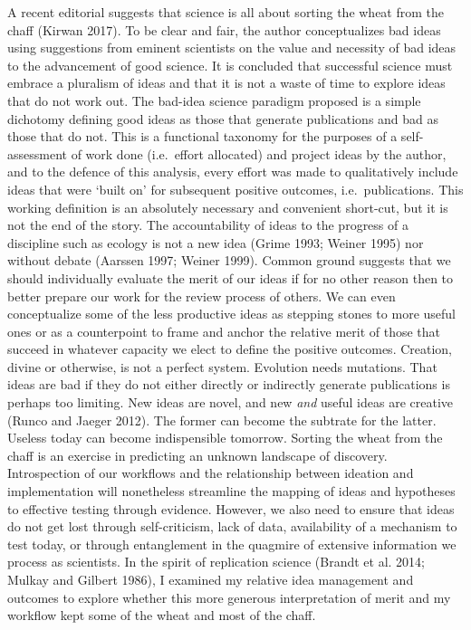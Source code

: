\documentclass[]{elsarticle} %
\begin{document}
A recent editorial suggests that science is all about sorting the wheat
from the chaff (Kirwan 2017). To be clear and fair, the author
conceptualizes bad ideas using suggestions from eminent scientists on
the value and necessity of bad ideas to the advancement of good science.
It is concluded that successful science must embrace a pluralism of
ideas and that it is not a waste of time to explore ideas that do not
work out. The bad-idea science paradigm proposed is a simple dichotomy
defining good ideas as those that generate publications and bad as those
that do not. This is a functional taxonomy for the purposes of a
self-assessment of work done (i.e.~effort allocated) and project ideas
by the author, and to the defence of this analysis, every effort was
made to qualitatively include ideas that were `built on' for subsequent
positive outcomes, i.e.~publications. This working definition is an
absolutely necessary and convenient short-cut, but it is not the end of
the story. The accountability of ideas to the progress of a discipline
such as ecology is not a new idea (Grime 1993; Weiner 1995) nor without
debate (Aarssen 1997; Weiner 1999). Common ground suggests that we
should individually evaluate the merit of our ideas if for no other
reason then to better prepare our work for the review process of others.
We can even conceptualize some of the less productive ideas as stepping
stones to more useful ones or as a counterpoint to frame and anchor the
relative merit of those that succeed in whatever capacity we elect to
define the positive outcomes. Creation, divine or otherwise, is not a
perfect system. Evolution needs mutations. That ideas are bad if they do
not either directly or indirectly generate publications is perhaps too
limiting. New ideas are novel, and new \emph{and} useful ideas are
creative (Runco and Jaeger 2012). The former can become the subtrate for
the latter. Useless today can become indispensible tomorrow. Sorting the
wheat from the chaff is an exercise in predicting an unknown landscape
of discovery. Introspection of our workflows and the relationship
between ideation and implementation will nonetheless streamline the
mapping of ideas and hypotheses to effective testing through evidence.
However, we also need to ensure that ideas do not get lost through
self-criticism, lack of data, availability of a mechanism to test today,
or through entanglement in the quagmire of extensive information we
process as scientists. In the spirit of replication science (Brandt et
al. 2014; Mulkay and Gilbert 1986), I examined my relative idea
management and outcomes to explore whether this more generous
interpretation of merit and my workflow kept some of the wheat and most
of the chaff.
\end{document}
